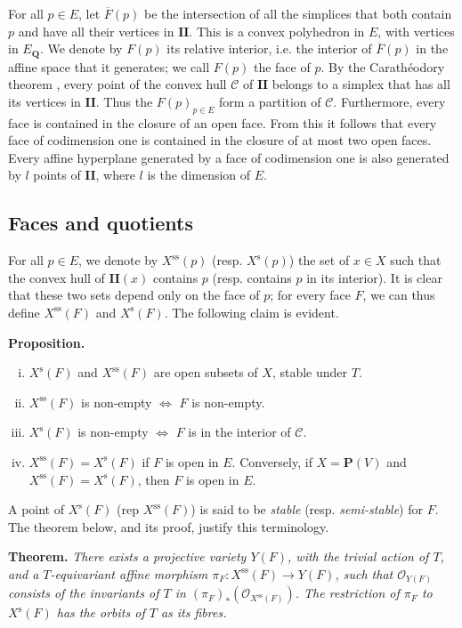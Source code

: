 \documentclass{article}
\newenvironment{itenv}[1]
  {\phantomsection\par\medskip\noindent\textbf{#1.}\itshape}
  {\par\medskip}
\newcommand{\scr}[1]{{\mathscr{#1}}}
\newcommand{\PP}{\mathbf{P}}
\newcommand{\QQ}{\mathbf{Q}}
\newcommand{\s}{\mathrm{s}}
\renewcommand{\ss}{\mathrm{ss}}
\newcommand{\II}{\mathbf{II}}
\newcommand{\oldpage}[1]{\marginpar{\footnotesize$\Big\vert$ \textit{p.~#1}}}
\begin{document}
For all $p\in E$, let $\overline{F}(p)$ be the intersection of all the simplices that both contain $p$ and have all their vertices in $\II$.
This is a convex polyhedron in $E$, with vertices in $E_\QQ$.
We denote by $F(p)$ its relative interior, i.e. the interior of $\overline{F}(p)$ in the affine space that it generates;
we call $F(p)$ the face of $p$.
By the Carath\'{e}odory theorem \cite[Theorem~1.21]{Val}, every point of the convex hull $\mathcal{C}$ of $\II$ belongs to a simplex that has all its vertices in $\II$.
Thus the $F(p)_{p\in E}$ form a partition of $\mathcal{C}$.
Furthermore, every face is contained in the closure of an open face.
From this it follows that every face of codimension one is contained in the closure of at most two open faces.
Every affine hyperplane generated by a face of codimension one is also generated by $l$ points of $\II$, where $l$ is the dimension of $E$.


\subsection{Faces and quotients}
\label{1.2}

For all $p\in E$, we denote by $X^\ss(p)$ (resp. $X^\s(p)$) the set of $x\in X$ such that the convex hull of $\II(x)$ contains $p$ (resp. contains $p$ in its interior).
It is clear that these two sets depend only on the face of $p$;
for every face $F$, we can thus define $X^\ss(F)$ and $X^\s(F)$.
The following claim is evident.

\begin{itenv}{Proposition}
  \begin{enumerate}[(i)]
    \item $X^\s(F)$ and $X^\ss(F)$ are open subsets of $X$, stable under $T$.
    \item $X^\ss(F)$ is non-empty $\iff$ $F$ is non-empty.
    \item $X^\s(F)$ is non-empty $\iff$ $F$ is in the interior of $\mathcal{C}$.
    \item $X^\ss(F)=X^\s(F)$ if $F$ is open in $E$.
      Conversely, if $X=\PP(V)$ and $X^\ss(F)=X^\s(F)$, then $F$ is open in $E$.
  \end{enumerate}
\end{itenv}

A point of $X^\s(F)$ (rep $X^\ss(F)$) is said to be \emph{stable} (resp. \emph{semi-stable}) for $F$.
The theorem below, and its proof, justify this terminology.

\begin{itenv}{Theorem}
\label{1.2-theorem}
  There exists a projective variety $Y(F)$, with the trivial action
\oldpage{513}
  of $T$, and a $T$-equivariant affine morphism $\pi_F\colon X^\ss(F)\to Y(F)$, such that $\scr{O}_{Y(F)}$ consists of the invariants of $T$ in $(\pi_F)_*(\scr{O}_{X^\ss(F)})$.
  The restriction of $\pi_F$ to $X^\s(F)$ has the orbits of $T$ as its fibres.
\end{itenv}
\end{document}
